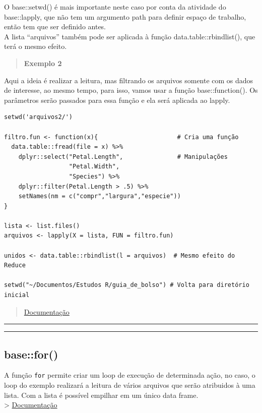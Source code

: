 \documentclass[
]{book}
\theoremstyle{definition}
\theoremstyle{definition}
\theoremstyle{definition}
\theoremstyle{definition}
\theoremstyle{remark}
\begin{document}
O base::setwd() é mais importante neste caso por conta da atividade do base::lapply, que não tem um argumento path para definir espaço de trabalho, então tem que ser definido antes.\\
A lista ``arquivos'' também pode ser aplicada à função data.table::rbindlist(), que terá o mesmo efeito.

\begin{quote}
\textbf{Exemplo 2}
\end{quote}

Aqui a ideia é realizar a leitura, mas filtrando os arquivos somente com os dados de interesse, ao mesmo tempo, para isso, vamos usar a função base::function(). Os parâmetros serão passados para essa função e ela será aplicada ao lapply.

\begin{verbatim}
setwd('arquivos2/')

filtro.fun <- function(x){                      # Cria uma função
  data.table::fread(file = x) %>% 
    dplyr::select("Petal.Length",               # Manipulações
                  "Petal.Width", 
                  "Species") %>%
    dplyr::filter(Petal.Length > .5) %>%
    setNames(nm = c("compr","largura","especie"))
}

lista <- list.files()
arquivos <- lapply(X = lista, FUN = filtro.fun)

unidos <- data.table::rbindlist(l = arquivos)  # Mesmo efeito do Reduce

setwd("~/Documentos/Estudos R/guia_de_bolso") # Volta para diretório inicial
\end{verbatim}

\begin{quote}
\href{https://www.rdocumentation.org/packages/base/versions/3.6.2/topics/function}{Documentação}
\end{quote}

\begin{center}\rule{0.5\linewidth}{0.5pt}\end{center}

\begin{center}\rule{0.5\linewidth}{0.5pt}\end{center}

\hypertarget{basefor}{%
\subsection{base::for()}\label{basefor}}

A função \texttt{for} permite criar um loop de execução de determinada ação, no caso, o loop do exemplo realizará a leitura de vários arquivos que serão atribuidos à uma lista. Com a lista é possível empilhar em um único data frame.\\
\textgreater{} \href{https://www.rdocumentation.org/packages/base/versions/3.6.2/topics/Control}{Documentação}
\end{document}
